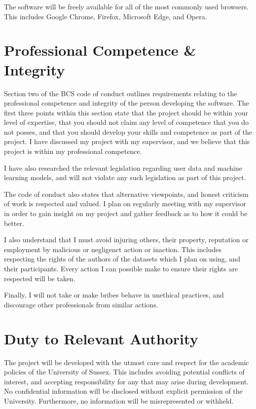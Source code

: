 \documentclass[twocolumn]{report}
\begin{document}
The software will be freely available for all of the most commonly used browsers. This includes Google Chrome, Firefox, Microsoft Edge, and Opera. 

\section{Professional Competence \& Integrity}   

Section two of the BCS code of conduct outlines requirements relating to the professional competence and integrity of the person developing the software. The first three points within this section state that the project should be within your level of expertise, that you should not claim any level of competence that you do not posses, and that you should develop your skills and competence as part of the project. I have discussed my project with my supervisor, and we believe that this project is within my professional competence.

I have also researched the relevant legislation regarding user data and machine learning models, and will not violate any such legislation as part of this project. 

The code of conduct also states that alternative viewpoints, and honest criticism of work is respected and valued. I plan on regularly meeting with my supervisor in order to gain insight on my project and gather feedback as to how it could be better. 

I also understand that I must avoid injuring others, their property, reputation or employment by malicious or negligenct action or inaction. This includes respecting the rights of the authors of the datasets which I plan on using, and their participants. Every action I can possible make to ensure their rights are respected will be taken. 

Finally, I will not take or make bribes behave in unethical practices, and discourage other professionals from similar actions.  

\section{Duty to Relevant Authority}   

The project will be developed with the utmost care and respect for the academic policies of the University of Sussex. This includes avoiding potential conflicts of interest, and accepting responsibility for any that may arise during development. No confidential information will be disclosed without explicit permission of the University. Furthermore, no information will be misrepresented or withheld. 
\end{document}
